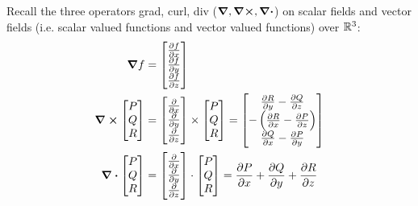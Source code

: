 Recall the three operators grad, curl, div (\(\grad, \curl, \div\)) on scalar fields and vector fields (i.e. scalar valued functions and vector valued functions) over \(\mathbb{R}^3\):
\begin{gather}
    \begin{split}
        \grad{f} &=
        \begin{bmatrix}
            \pdv{f}{x} \\
            \pdv{f}{y} \\
            \pdv{f}{z} \\
        \end{bmatrix} \\
        \curl{\begin{bmatrix}
                P \\ Q \\ R
            \end{bmatrix}} &=
        \begin{bmatrix}
            \pdv{}{x} \\
            \pdv{}{y} \\
            \pdv{}{z} \\
        \end{bmatrix} \times
        \begin{bmatrix}
            P \\ Q \\ R
        \end{bmatrix}
        =
        \begin{bmatrix}
            \pdv{R}{y} - \pdv{Q}{z}                 \\
            -\left( \pdv{R}{x} - \pdv{P}{z} \right) \\
            \pdv{Q}{x} - \pdv{P}{y}                 \\
        \end{bmatrix} \\
        \div{\begin{bmatrix}
                P \\ Q \\ R
            \end{bmatrix}} &=
        \begin{bmatrix}
            \pdv{}{x} \\
            \pdv{}{y} \\
            \pdv{}{z} \\
        \end{bmatrix} \cdot
        \begin{bmatrix}
            P \\ Q \\ R
        \end{bmatrix}
        =
        \pdv{P}{x} + \pdv{Q}{y} + \pdv{R}{z}
    \end{split}
\end{gather}
